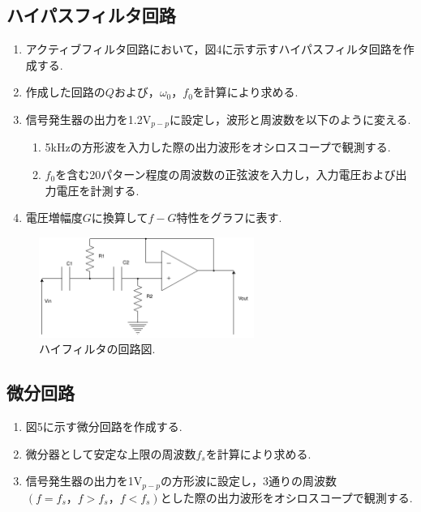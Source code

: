 \documentclass[twocolumn, 10pt,a4j]{jsarticle}
\begin{document}
    \subsection{ハイパスフィルタ回路}
        \begin{enumerate}
          \item アクティブフィルタ回路において，図4に示す示すハイパスフィルタ回路を作成する. \\
          \item 作成した回路の$Q$および，$\omega_{0}，f_{0}$を計算により求める. \\
          \item 信号発生器の出力を1.2V$_{p-p}$に設定し，波形と周波数を以下のように変える. \\
              \begin{enumerate}
                  \item 5kHzの方形波を入力した際の出力波形をオシロスコープで観測する. \\
                  \item $f_{0}$を含む20パターン程度の周波数の正弦波を入力し，入力電圧および出力電圧を計測する. \\
              \end{enumerate}
          \item 電圧増幅度$G$に換算して$f-G$特性をグラフに表す.
        \end{enumerate}

        \begin{figure}[]
          \begin{center}
              \includegraphics[width=7cm]{../img/highpass.png}
              \caption{ハイフィルタの回路図.}
          \end{center}
        \end{figure}
    
    \subsection{微分回路}
        \begin{enumerate}
          \item 図5に示す微分回路を作成する. \\
          \item 微分器として安定な上限の周波数$f_{s}$を計算により求める. \\
          \item 信号発生器の出力を1V$_{p-p}$の方形波に設定し，3通りの周波数$(f=f_{s}，f > f_{s}，f < f_{s})$とした際の出力波形をオシロスコープで観測する.
          
        \end{enumerate}
\end{document}
